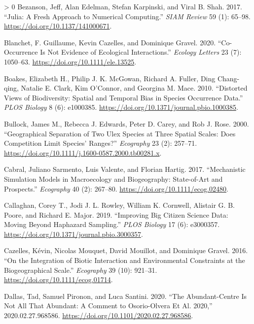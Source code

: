\documentclass[10pt,oneside]{article}
\newlength{\cslhangindent}
\newenvironment{CSLReferences}[3] %
 {%
  \setlength{\parindent}{0pt}
  \ifodd #1 \everypar{\setlength{\hangindent}{\cslhangindent}}\ignorespaces\fi
  \ifnum #2 > 0
  \setlength{\parskip}{#2\baselineskip}
  \fi
 }%
 {}
\begin{document}
\begin{CSLReferences}{1}{0}
\leavevmode\hypertarget{ref-Bezanson2017JulFre}{}%
Bezanson, Jeff, Alan Edelman, Stefan Karpinski, and Viral B. Shah. 2017.
{``Julia: A Fresh Approach to Numerical Computing.''} \emph{SIAM Review}
59 (1): 65--98. \url{https://doi.org/10.1137/141000671}.

\leavevmode\hypertarget{ref-Blanchet2020CooNot}{}%
Blanchet, F. Guillaume, Kevin Cazelles, and Dominique Gravel. 2020.
{``Co-Occurrence Is Not Evidence of Ecological Interactions.''}
\emph{Ecology Letters} 23 (7): 1050--63.
\url{https://doi.org/10.1111/ele.13525}.

\leavevmode\hypertarget{ref-Boakes2010DisVie}{}%
Boakes, Elizabeth H., Philip J. K. McGowan, Richard A. Fuller, Ding
Chang-qing, Natalie E. Clark, Kim O'Connor, and Georgina M. Mace. 2010.
{``Distorted Views of Biodiversity: Spatial and Temporal Bias in Species
Occurrence Data.''} \emph{PLOS Biology} 8 (6): e1000385.
\url{https://doi.org/10.1371/journal.pbio.1000385}.

\leavevmode\hypertarget{ref-Bullock2000GeoSep}{}%
Bullock, James M., Rebecca J. Edwards, Peter D. Carey, and Rob J. Rose.
2000. {``Geographical Separation of Two Ulex Species at Three Spatial
Scales: Does Competition Limit Species' Ranges?''} \emph{Ecography} 23
(2): 257--71. \url{https://doi.org/10.1111/j.1600-0587.2000.tb00281.x}.

\leavevmode\hypertarget{ref-Cabral2017MecSim}{}%
Cabral, Juliano Sarmento, Luis Valente, and Florian Hartig. 2017.
{``Mechanistic Simulation Models in Macroecology and Biogeography:
State-of-Art and Prospects.''} \emph{Ecography} 40 (2): 267--80.
\url{https://doi.org/10.1111/ecog.02480}.

\leavevmode\hypertarget{ref-Callaghan2019ImpBig}{}%
Callaghan, Corey T., Jodi J. L. Rowley, William K. Cornwell, Alistair G.
B. Poore, and Richard E. Major. 2019. {``Improving Big Citizen Science
Data: Moving Beyond Haphazard Sampling.''} \emph{PLOS Biology} 17 (6):
e3000357. \url{https://doi.org/10.1371/journal.pbio.3000357}.

\leavevmode\hypertarget{ref-Cazelles2016IntBio}{}%
Cazelles, Kévin, Nicolas Mouquet, David Mouillot, and Dominique Gravel.
2016. {``On the Integration of Biotic Interaction and Environmental
Constraints at the Biogeographical Scale.''} \emph{Ecography} 39 (10):
921--31. \url{https://doi.org/10.1111/ecog.01714}.

\leavevmode\hypertarget{ref-Dallas2020AbuNot}{}%
Dallas, Tad, Samuel Pironon, and Luca Santini. 2020. {``The
Abundant-Centre Is Not All That Abundant: A Comment to Osorio-Olvera Et
Al. 2020,''} 2020.02.27.968586.
\url{https://doi.org/10.1101/2020.02.27.968586}.


\end{CSLReferences}
\end{document}
